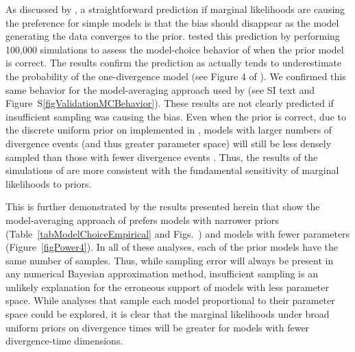 As discussed by \citet{Oaks2012}, a straightforward prediction if marginal
likelihoods are causing the preference for simple models is that the bias should
disappear as the model generating the data converges to the prior.
\citet{Oaks2012} tested this prediction by performing 100,000 simulations to
assess the model-choice behavior of \msb when the prior model is correct.
The results confirm the prediction as \msb actually tends to underestimate
the probability of the one-divergence model (see Figure 4 of
\citet{Oaks2012}).
We confirmed this same behavior for the model-averaging approach used by
\citet{Hickerson2013} (see SI text and Figure~S\ref{figValidationMCBehavior}).
These results are not clearly predicted if insufficient sampling was causing
the bias.
Even when the prior is correct, due to the discrete uniform prior on
\numt{} implemented in \msb, models with larger numbers of divergence
events (and thus greater parameter space) will still be less densely
sampled than those with fewer divergence events \citep{Oaks2012}.
Thus, the results of the simulations of \citet{Oaks2012} are more consistent
with the fundamental sensitivity of marginal likelihoods to priors.

This is further demonstrated by the results presented herein that show the
model-averaging approach of \citet{Hickerson2013} prefers models with narrower
\divt{} priors (Table~\ref{tabModelChoiceEmpirical} and
Figs.~)
and models with fewer \divt{} parameters (Figure~\ref{figPower4}).
In all of these analyses, each of the prior models have the same number of
samples.
Thus, while sampling error will always be present in any numerical Bayesian
approximation method, insufficient sampling is an unlikely explanation for the
erroneous support of models with less parameter space.
While analyses that sample each model proportional to their parameter space
could be explored, it is clear that the marginal likelihoods under broad
uniform priors on divergence times will be greater for models with fewer
divergence-time dimensions.




